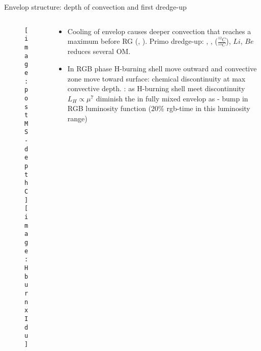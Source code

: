 \begin{frame}{Envelop structure: depth of convection and first dredge-up}
\begin{columns}[T]\begin{column}{0.44\textwidth}
\begin{figure}[!ht]
\texttt{[image: postMS-depthC]}\label{fig:postMS-depthC}
\texttt{[image: HburnxIdu]}\label{fig:HburnxIdu}
\end{figure}
\end{column}
\begin{column}{0.55\textwidth}
\begin{itemize}
\item Cooling of envelop causes deeper convection that reaches a maximum before RG (, \xaumenta{\kappa}). Primo dredge-up: , ,  ($\frac{^{12}C}{^{13}C}$), $Li$, $Be$ reduces several OM.
\item In RGB phase H-burning shell move outward and convective zone move toward surface: chemical discontinuity at max convective depth. : as H-burning shell meet discontinuity $L_H\propto\mu^7$ diminish the in fully mixed envelop  as  - bump in RGB luminosity function ($20\%$ rgb-time in this luminosity range)
\end{itemize}
\end{column}\end{columns}
\end{frame}

